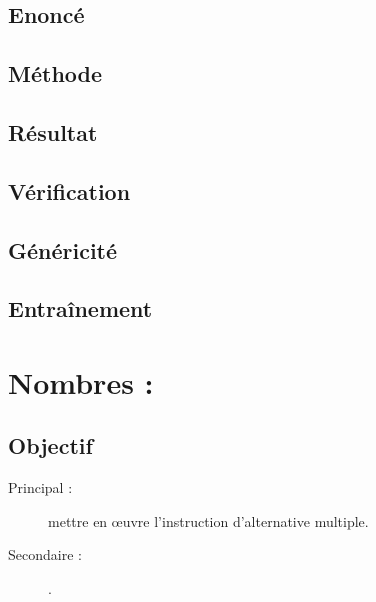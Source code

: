 \subsection{Enoncé}\label{tests:textes:enonce}

\subsection{Méthode}\label{tests:textes:methode}

\subsection{Résultat}\label{tests:textes:resultat}

\subsection{Vérification}\label{tests:textes:verification}

\subsection{Généricité}\label{tests:textes:genericite}

\subsection{Entraînement}\label{tests:textes:entrainement}

\section{Nombres : }

\subsection{Objectif}\label{tests:nombres:objectif}
\begin{description}
\item[Principal : ] mettre en \oe uvre l'instruction d'alternative multiple.
\item[Secondaire :] .
\end{description}


